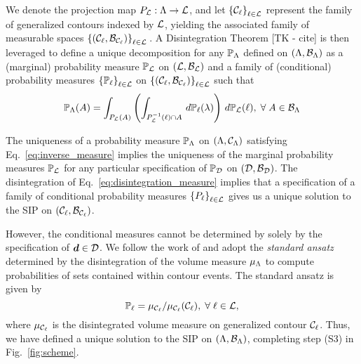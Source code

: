 We denote the projection map $P_{\mathcal{L}} : {\Lambda} \to \mathcal{L}$, and let $\left\{\mathcal{C}_\ell\right\}_{\ell\in\mathcal{L}}$ represent the family of generalized contours indexed by $\mathcal{L}$, yielding the associated family of measurable spaces $\left\{\left ( \mathcal{C}_\ell, \mathcal{B}_{\mathcal{C}_\ell} \right )\right\}_{\ell\in\mathcal{L}}{}$.
A Disintegration Theorem [TK - cite] is then leveraged to define a unique decomposition for any $\operatorname*{\mathbb{P}_{{\Lambda}}}$ defined on $({\Lambda}, \mathcal{B}_{{\Lambda}})$ as a (marginal) probability measure $\mathbb{P}_{\mathcal{L}}$ on $(\mathcal{L}, \mathcal{B}_{\mathcal{L}})$ and a family of (conditional) probability measures $\left\{\mathbb{P}_\ell\right\}_{\ell\in\mathcal{L}}$ on $\left\{\left ( \mathcal{C}_\ell, \mathcal{B}_{\mathcal{C}_\ell} \right )\right\}_{\ell\in\mathcal{L}}$ such that
\begin{equation}\label{eq:disintegration_measure}
\operatorname*{\mathbb{P}_{{\Lambda}}} (A) = \int_{P_{\mathcal{L}}(A)} \left ( \int_{P_{\mathcal{L}}^{-1} (\ell) \cap A}\, d\mathbb{P}_\ell(\lambda) \right )\, d\mathbb{P}_{\mathcal{L}} (\ell), \; \forall \; A \in \mathcal{B}_{{\Lambda}}
\end{equation}

The uniqueness of a probability measure $\operatorname*{\mathbb{P}_{{\Lambda}}}$ on ${({\Lambda}, \mathcal{C}_{{\Lambda}})}$ satisfying Eq.~\eqref{eq:inverse_measure} implies the uniqueness of the marginal probability measures $\mathbb{P}_{\mathcal{L}}$ for any particular specification of $\operatorname*{\mathbb{P}_{\mathcal{D}}}$ on ${(\mathcal{D}, \mathcal{B}_{\mathcal{D}})}$.
The disintegration of Eq.~\eqref{eq:disintegration_measure} implies that a specification of a family of conditional probability measures $\left\{P_\ell\right\}_{\ell\in\mathcal{L}}$ gives us a unique solution to the SIP on ${(\mathcal{C}_\ell, \mathcal{B}_{\mathcal{C}_\ell})}$.

However, the conditional measures cannot be determined by solely by the specification of $\operatorname*{\boldsymbol{d}}\in\mathcal{D}$.
We follow the work of \cite{BET+14} and adopt the \emph{standard ansatz} determined by the disintegration of the volume measure $\mu_{{\Lambda}}$ to compute probabilities of sets contained within contour events.
The standard ansatz is given by
\begin{equation}\label{eq:standard_ansatz}
\mathbb{P}_\ell = \mu_{\mathcal{C}_\ell} / \mu_{\mathcal{C}_\ell}(\mathcal{C}_\ell), \; \forall \; \ell \in \mathcal{L},
\end{equation}
where $\mu_{\mathcal{C}_\ell}$ is the disintegrated volume measure on generalized contour $\mathcal{C}_\ell$.
Thus, we have defined a unique solution to the SIP on ${({\Lambda}, \mathcal{B}_{{\Lambda}})}$, completing step (S3) in Fig.~\ref{fig:scheme}.
